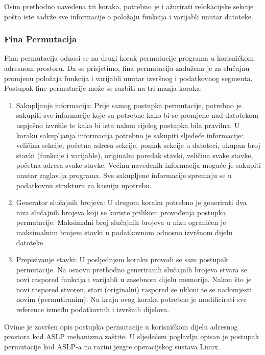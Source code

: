 \documentclass[times, utf8, diplomski, numeric]{fer}
\begin{document}
Osim prethodno navedena tri koraka, potrebno je i ažurirati
relokacijske sekcije pošto iste sadrže sve informacije o položaju
funkcija i varijabli unutar datoteke.

\subsubsection{Fina Permutacija}

Fina permutacija odnosi se na drugi korak permutacije programa u
korisničkom adresnom prostoru. Da se prisjetimo, fina permutacija
zadužena je za slučajnu promjenu položaja funkcija i varijabli
unutar izvršnog i podatkovnog segmenta. Postupak fine permutacije
može se razbiti na tri manja koraka:

\begin{enumerate}
\item Sakupljanje informacija: Prije samog postupka permutacije,
potrebno je sakupiti sve informacije koje su potrebne kako bi se
promjene nad datotekom uspješno izvršile te kako bi ista nakon
cijelog postupka bila pravilna. U koraku sakupljanja informacija
potrebno je sakupiti sljedeće informacije: veličina sekcije,
početna adresa sekcije, pomak sekcije u datoteci, ukupan broj
stavki (funkcije i varijable), originalni poredak stavki,
veličina svake stavke, početna adresa svake stavke. Većinu
navedenih informacija moguće je sakupiti unutar zaglavlja
programa. Sve sakupljene informacije spremaju se u podatkovnu
strukturu za kasniju upotrebu.

\item Generator slučajnih brojeva: U drugom koraku potrebno je
generirati dva niza slučajnih brojeva koji se koriste prilikom
provođenja postupka permutacije. Maksimalni broj slučajnih
brojeva u nizu ograničen je maksimalnim brojem stavki u
podatkovnom odnosno izvršnom dijelu datoteke.

\item Prepisivanje stavki: U posljednjem koraku provodi se sam
postupak permutacije. Na osnovu prethodno generiranih slučajnih
brojeva stvara se novi raspored funkcija i varijabli u zasebnom
dijelu memorije. Nakon što je novi raspored stvoren, stari
(originalni) raspored se ukloni te se nadomjesti novim
(permutiranim). Na kraju ovog koraka potrebno je modificirati sve
reference između podatkovnih i izvršnih dijelova.

\end{enumerate}

Ovime je završen opis postupka permutacije u korisničkom dijelu
adresnog prostora kod ASLP mehanizma zaštite. U sljedećem
poglavlju opisan je postupak permutacije kod ASLP-a na razini
jezgre operacijskog sustava Linux.
\end{document}
